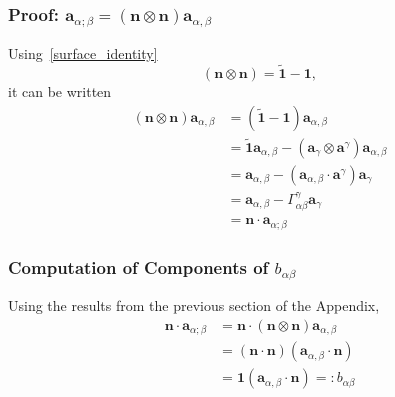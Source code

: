 \documentclass[../main.tex]{subfiles}
\begin{document}
\begin{appendices}
    \subsubsection{Proof: \texorpdfstring{$\boldsymbol{a}_{\alpha;\beta} = (\boldsymbol{n} \otimes \boldsymbol{n}) \boldsymbol{a}_{\alpha, \beta}$}{Cov Derivative}}
    Using~\eqref{surface_identity}
    \begin{equation}\label{eq:eq12}
        \left( \boldsymbol{n} \otimes \boldsymbol{n} \right) = \boldsymbol{\tilde{1}} - \boldsymbol{1},
    \end{equation}
    it can be written     
    \begin{equation}\label{appendices:cov_tangent_derivative}
        \begin{split}
            \left( \boldsymbol{n} \otimes \boldsymbol{n} \right) \boldsymbol{a}_{\alpha, \beta} &= \left( \boldsymbol{\tilde{1}} - \boldsymbol{1} \right) \boldsymbol{a}_{\alpha, \beta} \\ &= \boldsymbol{\tilde{1}} \boldsymbol{a}_{\alpha, \beta} - \left( \boldsymbol{a}_{\gamma} \otimes \boldsymbol{a}^{\gamma} \right) \boldsymbol{a}_{\alpha, \beta} \\
            &= \boldsymbol{a}_{\alpha, \beta} - \left( \boldsymbol{a}_{\alpha, \beta} \cdot \boldsymbol{a}^{\gamma}\right) \boldsymbol{a}_{\gamma} \\
            &= \boldsymbol{a}_{\alpha, \beta} - \Gamma_{\alpha \beta}^{\gamma} \boldsymbol{a}_{\gamma}\\
            &= \boldsymbol{n} \cdot \boldsymbol{a}_{\alpha ; \beta}
        \end{split}
    \end{equation}
    \subsubsection{Computation of Components of \texorpdfstring{$b_{\alpha \beta}$}{Curvature tensor}}
    Using the results from the previous section of the Appendix,
    \begin{equation}\label{appendices:curvature_tensor_derivation}
        \begin{split}
            \boldsymbol{n} \cdot \boldsymbol{a}_{\alpha ; \beta} &= \boldsymbol{n} \cdot \left( \boldsymbol{n} \otimes \boldsymbol{n} \right) \boldsymbol{a}_{\alpha, \beta} \\
            &= \left( \boldsymbol{n} \cdot \boldsymbol{n} \right) \left( \boldsymbol{a}_{\alpha, \beta} \cdot \boldsymbol{n} \right) \\
            &= \boldsymbol{1} \left( \boldsymbol{a}_{\alpha, \beta} \cdot \boldsymbol{n} \right) =: b_{\alpha \beta}
        \end{split}
    \end{equation}
        

\end{appendices}
\end{document}
